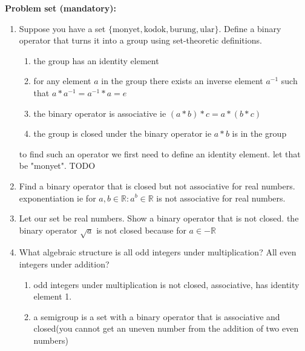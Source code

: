 \documentclass{article}
\begin{document}
\textbf{Problem set (mandatory):}

\begin{enumerate}
    \item Suppose you have a set $\{\text{monyet}, \text{kodok}, \text{burung}, \text{ular}\}$. Define a binary operator that turns it into a group using set-theoretic definitions.
    
    \begin{enumerate}
        \item the group has an identity element
        \item for any element $a$ in the group there exists an inverse element $a^{-1}$ such that $a * a^{-1} = a^{-1} * a = e$
        \item the binary operator is associative ie $(a * b) * c = a * (b * c)$
        \item the group is closed under the binary operator ie $a * b$ is in the group
    \end{enumerate}

    to find such an operator we first need to define an identity element. let that be "monyet".
    TODO

    \item Find a binary operator that is closed but not associative for real numbers.
    exponentiation ie for $a, b \in \mathbb{R}: a^b \in \mathbb{R} $ is not associative for real numbers.
    
    \item Let our set be real numbers. Show a binary operator that is not closed.
    the binary operator $\sqrt{a}$ is not closed because for $a \in -\mathbb{R}$ 
    
    \item What algebraic structure is all odd integers under multiplication? All even integers under addition?
    \begin{enumerate}
        \item odd integers under multiplication is not closed, associative, has identity element 1.
        \item a semigroup is a set with a binary operator that is associative and closed(you cannot get an uneven number from the addition of two even numbers)
    \end{enumerate}


\end{enumerate}
\end{document}
